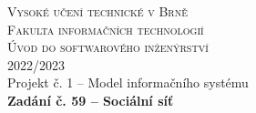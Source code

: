 \documentclass{article}
\begin{document}
\pagestyle{fancy}

\center
\textsc{ \huge{Vysoké učení technické v Brně} } \\ [0.5cm]
\textsc{ \huge{Fakulta informačních technologií} } \\ [5cm]
\textsc{ \huge{Úvod do softwarového inženýrství} } \\ [0.5cm]
\textsc{ \huge{2022/2023} } \\ [3cm]
\huge{Projekt č. 1 -- Model informačního systému} \\ [2cm]
\textbf{ \huge{Zadání č. 59 -- Sociální síť} }

\fancyhf{} %
\renewcommand{\headrulewidth}{0pt}

\end{document}

